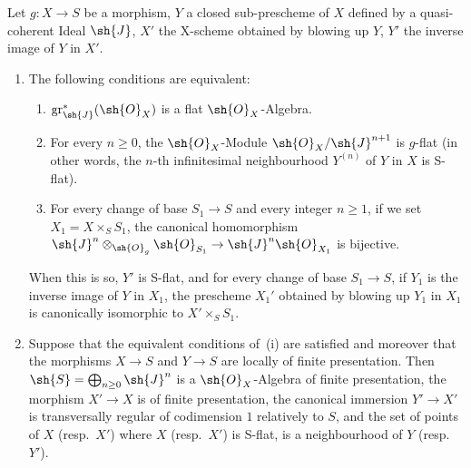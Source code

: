 \begin{proposition}[19.4.6]
\label{IV.19.4.6}
Let $g:X\to S$ be a morphism, $Y$ a closed sub-prescheme of $X$ defined by a quasi-coherent Ideal $\sh{J}$, $X'$ the X-scheme obtained by blowing up $Y$, $Y'$ the inverse image of $Y$ in $X'$.
\begin{enumerate}[label=(\roman*)]
  \item The following conditions are equivalent:
  \begin{enumerate}[label=\emph{\alph*)}]
    \item $\operatorname{gr}_\sh{J}^*(\sh{O}_X)$ is a flat $\sh{O}_X$-Algebra.
    \item For every $n\geq 0$, the $\sh{O}_X$-Module $\sh{O}_X/\sh{J}^{n+1}$ is $g$-flat (in other words, the $n$-th infinitesimal neighbourhood $Y^{(n)}$ of $Y$ in $X$  is S-flat).
    \item For every change of base $S_1\to S$ and every integer $n\geq 1$, if we set $X_1=X\times_S S_1$, the canonical homomorphism $\sh{J}^n\otimes_{\sh{O}_g}\sh{O}_{S_1}\to\sh{J}^n\sh{O}_{X_1}$ is bijective.
  \end{enumerate}
When this is so, $Y'$ is S-flat, and for every change of base $S_1\to S$, if $Y_1$ is the inverse image of $Y$ in $X_1$, the prescheme $X_1'$ obtained by blowing up $Y_1$ in $X_1$ is canonically isomorphic to $X'\times_S S_1$.
  \item Suppose that the equivalent conditions of~(i) are satisfied and moreover that the morphisms $X\to S$ and $Y\to S$ are locally of finite presentation.
Then $\sh{S}=\bigoplus_{n\geq 0}\sh{J}^n$ is a $\sh{O}_X$-Algebra of finite presentation, the morphism $X'\to X$ is of finite presentation, the canonical immersion $Y'\to X'$ is transversally regular of codimension $1$ relatively to $S$, and the set of points of $X$ (resp.\ $X'$) where $X$ (resp.\ $X'$) is S-flat, is a neighbourhood of $Y$ (resp.\ $Y'$).
\end{enumerate}
\end{proposition}

